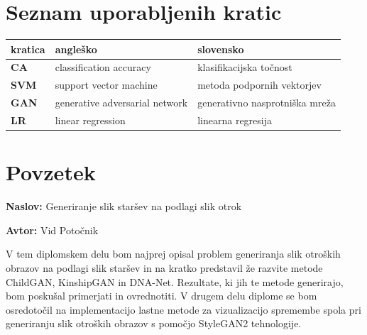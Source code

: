 \documentclass[a4paper,12pt,openright]{book}
\newcommand{\ttitle}{Generiranje slik staršev na podlagi slik otrok}
\newcommand{\tauthor}{Vid Potočnik}
\newcommand{\clearemptydoublepage}{\newpage{\pagestyle{empty}\cleardoublepage}}
\begin{document}


\pagestyle{empty}
\def\thepage{}%
\tableofcontents{}


\clearemptydoublepage


\chapter*{Seznam uporabljenih kratic}

\noindent\begin{tabular}{p{}|p{}|p{}}    %
  {\bf kratica} & {\bf angleško} & {\bf slovensko} \\ \hline
  {\bf CA}      & classification accuracy & klasifikacijska točnost \\
  {\bf SVM}   & support vector machine & metoda podpornih vektorjev \\
  {\bf GAN}   & generative adversarial network & generativno nasprotniška mreža \\
  {\bf LR}   & linear regression & linearna regresija  \\
\end{tabular}


\clearemptydoublepage

\chapter*{Povzetek}

\noindent\textbf{Naslov:} \ttitle
\bigskip

\noindent\textbf{Avtor:} \tauthor
\bigskip



\noindent V tem diplomskem delu bom najprej opisal problem generiranja slik otroških obrazov na podlagi slik staršev in na kratko predstavil že razvite metode ChildGAN, KinshipGAN in DNA-Net. Rezultate, ki jih te metode generirajo, bom poskušal primerjati in ovrednotiti. 
V drugem delu diplome se bom osredotočil na implementacijo lastne metode za vizualizacijo spremembe spola pri generiranju slik otroških obrazov s pomočjo StyleGAN2 tehnologije.
\end{document}
